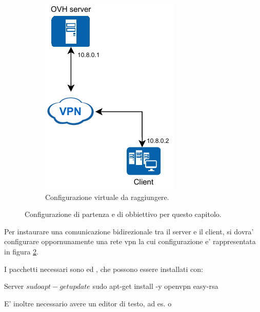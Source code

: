 \begin{figure}[h]
\begin{subfigure}{0.5\textwidth}
        \includegraphics[height=1.2\linewidth]{immagini/diag-simple_ips_vpn}
        \caption{Configurazione virtuale da raggiungere.}
        \label{fig:diag-simple_ips_vpn}
    \end{subfigure}%
    \caption{Configurazione di partenza e di obbiettivo per questo capitolo. \cite{icons}}
\end{figure}

Per instaurare una comunicazione bidirezionale tra il server e il client, si dovra' configurare oppornunamente una rete vpn la cui configurazione e' rappresentata in figura \ref{fig:diag-simple_ips_vpn}.

I pacchetti necessari sono  ed , che possono essere installati con:

\begin{bashcode}{Server}{}
$ sudo apt-get update
$ sudo apt-get install -y openvpn easy-rsa
\end{bashcode}

E' inoltre necessario avere un editor di testo, ad es.  o 


